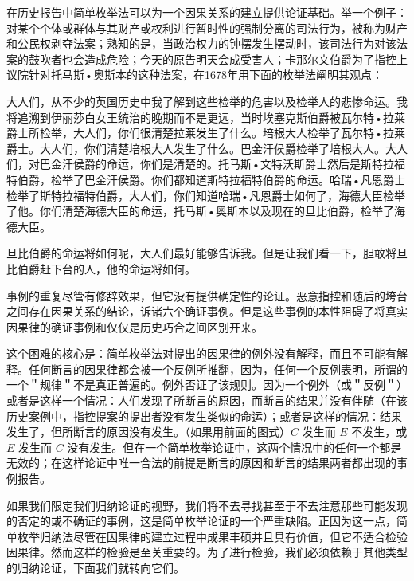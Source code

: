 在历史报告中简单枚举法可以为一个因果关系的建立提供论证基础。举一个例子：对某个个体或群体与其财产或权利进行暂时性的强制分离的司法行为，被称为财产和公民权剥夺法案；熟知的是，当政治权力的钟摆发生摆动时，该司法行为对该法案的鼓吹者也会造成危险；今天的原告明天会成受害人；卡那尔文伯爵为了指控上议院针对托马斯•奥斯本的这种法案，在1678年用下面的枚举法阐明其观点：

大人们，从不少的英国历史中我了解到这些检举的危害以及检举人的悲惨命运。我将追溯到伊丽莎白女王统治的晚期而不是更远，当时埃塞克斯伯爵被瓦尔特•拉莱爵士所检举，大人们，你们很清楚拉莱发生了什么。培根大人检举了瓦尔特•拉莱爵士。大人们，你们清楚培根大人发生了什么。巴金汗侯爵检举了培根大人。大人们，对巴金汗侯爵的命运，你们是清楚的。托马斯•文特沃斯爵士然后是斯特拉福特伯爵，检举了巴金汗侯爵。你们都知道斯特拉福特伯爵的命运。哈瑞•凡恩爵士检举了斯特拉福特伯爵，大人们，你们知道哈瑞•凡恩爵士如何了，海德大臣检举了他。你们清楚海德大臣的命运，托马斯•奥斯本以及现在的旦比伯爵，检举了海德大臣。

旦比伯爵的命运将如何呢，大人们最好能够告诉我。但是让我们看一下，胆敢将旦比伯爵赶下台的人，他的命运将如何。\cite{roberts1966}

事例的重复尽管有修辞效果，但它没有提供确定性的论证。恶意指控和随后的垮台之间存在因果关系的结论，诉诸六个确证事例。但是这些事例的本性阻碍了将真实因果律的确证事例和仅仅是历史巧合之间区别开来。

这个困难的核心是：简单枚举法对提出的因果律的例外没有解释，而且不可能有解释。任何断言的因果律都会被一个反例所推翻，因为，任何一个反例表明，所谓的一个＂规律＂不是真正普遍的。例外否证了该规则。因为一个例外（或＂反例＂）或者是这样一个情况：人们发现了所断言的原因，而断言的结果并没有伴随（在该历史案例中，指控提案的提出者没有发生类似的命运）；或者是这样的情况：结果发生了，但所断言的原因没有发生。（如果用前面的图式）$C$ 发生而 $E$ 不发生，或 $E$ 发生而 $C$ 没有发生。但在一个简单枚举论证中，这两个情况中的任何一个都是无效的；在这样论证中唯一合法的前提是断言的原因和断言的结果两者都出现的事例报告。

如果我们限定我们归纳论证的视野，我们将不去寻找甚至于不去注意那些可能发现的否定的或不确证的事例，这是简单枚举论证的一个严重缺陷。正因为这一点，简单枚举归纳法尽管在因果律的建立过程中成果丰硕并且具有价值，但它不适合检验因果律。然而这样的检验是至关重要的。为了进行检验，我们必须依赖于其他类型的归纳论证，下面我们就转向它们。

